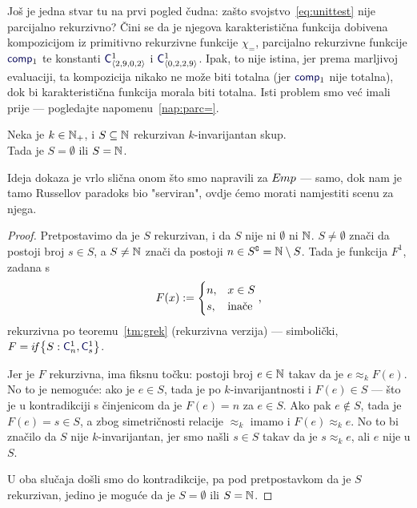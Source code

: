 Još je jedna stvar tu na prvi pogled čudna: zašto svojstvo~\eqref{eq:unittest} nije parcijalno rekurzivno? Čini se da je njegova karakteristična funkcija dobivena kompozicijom iz primitivno rekurzivne funkcije $\chi_=$, parcijalno rekurzivne funkcije $\f{comp}_1$ te konstanti $\f C^1_{\kr{2,9,0,2}}$ i $\f C^1_{\kr{0,2,2,9}}$. Ipak, to nije istina, jer prema marljivoj evaluaciji, ta kompozicija nikako ne može biti totalna (jer $\f{comp}_1$ nije totalna), dok bi karakteristična funkcija morala biti totalna. Isti problem smo već imali prije --- pogledajte napomenu~\ref{nap:parc=}.


\begin{teorem}\label{tm:Rice}
Neka je $k\in{\mathbb N}_+$, i $S\subseteq{\mathbb N}$ rekurzivan $k$-invarijantan skup.\\
	Tada je $S=\emptyset$ ili $S={\mathbb N}$.
\end{teorem}

Ideja dokaza je vrlo slična onom što smo napravili za $E\mspace{-1mu}mp$ --- samo, dok nam je tamo Russellov paradoks bio "serviran"\!, ovdje ćemo morati namjestiti scenu za njega.

\begin{proof}
Pretpostavimo da je $S$ rekurzivan, i da $S$ nije ni $\emptyset$ ni ${\mathbb N}$. $S\ne\emptyset$ znači da postoji broj $s\in S$, a $S\ne{\mathbb N}$ znači da postoji $n\in S\sp{{\scriptscriptstyle\complement}}={\mathbb N}\setminus S$. Tada je funkcija $F^1$, zadana s
\begin{equation}
    F(x):=\begin{cases}
        n,&x\in S\\
        s,&\text{inače}
    \end{cases}\text,
\end{equation}
    rekurzivna po teoremu~\ref{tm:grek} (rekurzivna verzija) --- simbolički, $F=\IF{S:\f C_n^1,\f C_s^1}$.

Jer je $F$ rekurzivna, ima fiksnu točku: postoji broj $e\in{\mathbb N}$ takav da je $e\approx_k F(e)$. No to je nemoguće: ako je $e\in S$, tada je po $k$-invarijantnosti i $F(e)\in S$ --- što je u kontradikciji s činjenicom da je $F(e)=n$ za $e\in S$. Ako pak $e\notin S$, tada je $F(e)=s\in S$, a zbog simetričnosti relacije $\approx_k$ imamo i $F(e)\approx_k e$. No to bi značilo da $S$ nije $k$-invarijantan, jer smo našli $s\in S$ takav da je $s\approx_k e$, ali $e$ nije u $S$.

U oba slučaja došli smo do kontradikcije, pa pod pretpostavkom da je $S$ rekurzivan, jedino je moguće da je $S=\emptyset$ ili $S={\mathbb N}$.
\end{proof}


